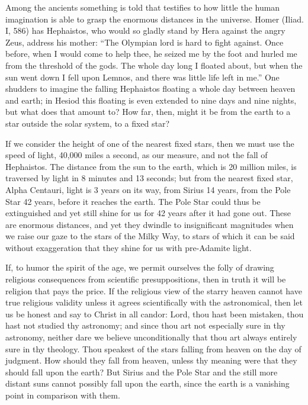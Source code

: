 \documentclass[12pt]{book}
\newcommand{\opage}[1]{\marginnote{\footnotesize\textit{[#1]}}}
\begin{document}
Among the ancients something is told that testifies to how little the
human imagination is able to grasp the enormous distances in the
universe. Homer (Iliad. I, 586) has Hephaistos, who would so gladly
stand by Hera against the angry Zeus, address his mother: ``The Olympian
lord is hard to fight against. Once before, when I would come to help
thee, he seized me by the foot and hurled me from the threshold of the
gods. The whole day long I floated about, but when the sun went down I
fell upon Lemnos, and there was little life left in me.'' One shudders
to imagine the falling Hephaistos floating a whole day between heaven
and earth; in Hesiod this floating is even extended to nine days and
nine nights, but what does that amount to? How far, then, might it be
from the earth to a star outside the solar system, to a fixed star?

If we consider the height of one of the nearest fixed stars, then we
must use the speed of light, 40,000 miles a second, as our measure, and
not the fall of Hephaistos. The distance from the sun to the earth,
which is 20 million miles, is traversed by light in 8 minutes and 13
seconds; but from
the nearest fixed star, Alpha Centauri, light is 3\textonehalf{} years
on its way, from Sirius 14 years, from the Pole Star 42 years, before it
reaches the earth. The Pole Star could thus be extinguished and yet
still shine for us for 42 years after it had gone out. These are
enormous distances, and yet they dwindle to insignificant magnitudes
when we raise our gaze to the stars of the Milky Way, to stars of which
it can be said without exaggeration that they shine for us with
pre-Adamite light.
\opage{68}\setcounter{footnote}{0}%

If, to humor the spirit of the age, we permit ourselves the folly of
drawing religious consequences from scientific presuppositions, then in
truth it will be religion that pays the price. If the religious view of
the starry heaven cannot have true religious validity unless it agrees
scientifically with the astronomical, then let us be honest and say to
Christ in all candor: Lord, thou hast been mistaken, thou hast not
studied thy astronomy; and since thou art not especially sure in thy
astronomy, neither dare we believe unconditionally that thou art always
entirely sure in thy theology. Thou speakest of the stars falling from
heaven on the day of judgment. How should they fall from heaven, unless
thy meaning were that they should fall upon the earth? But Sirius and
the Pole Star and the still more distant suns cannot possibly fall upon
the earth, since the earth is a vanishing point in comparison with them.
\end{document}
